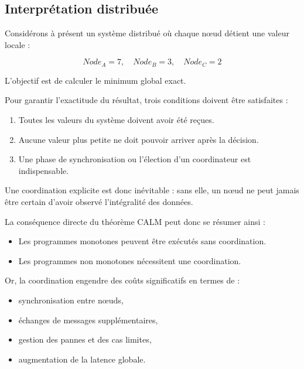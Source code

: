 \documentclass[12pt,a4paper]{article}
\begin{document}
\subsection*{Interprétation distribuée}

Considérons à présent un système distribué où chaque nœud détient une valeur locale :

\[
Node_A = 7, \quad
Node_B = 3, \quad
Node_C = 2
\]

L'objectif est de calculer le minimum global exact.

\begin{center}
\end{center}

Pour garantir l'exactitude du résultat, trois conditions doivent être satisfaites :

\begin{enumerate}
\item Toutes les valeurs du système doivent avoir été reçues.
\item Aucune valeur plus petite ne doit pouvoir arriver après la décision.
\item Une phase de synchronisation ou l'élection d'un coordinateur est indispensable.
\end{enumerate}

Une coordination explicite est donc inévitable : sans elle, un nœud ne peut jamais
être certain d'avoir observé l'intégralité des données.

La conséquence directe du théorème CALM peut donc se résumer ainsi :

\begin{itemize}
\item Les programmes monotones peuvent être exécutés sans coordination.
\item Les programmes non monotones nécessitent une coordination.
\end{itemize}

Or, la coordination engendre des coûts significatifs en termes de :
\begin{itemize}
\item synchronisation entre nœuds,
\item échanges de messages supplémentaires,
\item gestion des pannes et des cas limites,
\item augmentation de la latence globale.
\end{itemize}
\end{document}
